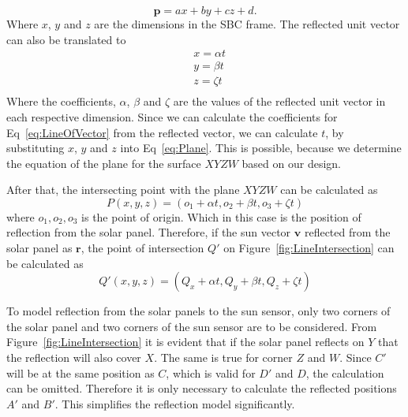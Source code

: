 \begin{equation}
	\mathbf{p} = ax + by + cz + d.
	\label{eq:Plane}
\end{equation}
Where $x$, $y$ and $z$ are the dimensions in the SBC frame. The reflected unit vector can also be translated to 
\begin{equation}
	\begin{aligned}
		&	x = \alpha t \\
		&	y = \beta t \\
		&	z = \zeta t \\
	\end{aligned}
	\label{eq:LineOfVector}
\end{equation}
Where the coefficients, $\alpha$, $\beta$ and $\zeta$ are the values of the reflected unit vector in each respective dimension. Since we can calculate the coefficients for Eq~\ref{eq:LineOfVector} from the reflected vector, we can calculate $t$, by substituting $x$, $y$ and $z$ into Eq~\ref{eq:Plane}. This is possible, because we determine the equation of the plane for the surface $XYZW$ based on our design. 

After that, the intersecting point with the plane $XYZW$ can be calculated as
\begin{equation}
	P(x, y, z) = (o_1 + \alpha t, o_2 + \beta t, o_3 + \zeta t)
	\label{eq:Intersection}
\end{equation}
where $o_1, o_2, o_3$ is the point of origin. Which in this case is the position of reflection from the solar panel. Therefore, if the sun vector $\mathbf{v}$ reflected from the solar panel as $\mathbf{r}$, the point of intersection $Q'$ on Figure~\ref{fig:LineIntersection} can be calculated as
\begin{equation}
	Q'(x, y, z) = (Q_x + \alpha t, Q_y + \beta t, Q_z + \zeta t)
	\label{eq:SpecificIntersection}
\end{equation}

To model reflection from the solar panels to the sun sensor, only two corners of the solar panel and two corners of the sun sensor are to be considered. From Figure~\ref{fig:LineIntersection} it is evident that if the solar panel reflects on $Y$ that the reflection will also cover $X$. The same is true for corner $Z$ and $W$. Since $C'$ will be at the same position as $C$, which is valid for $D'$ and $D$, the calculation can be omitted. Therefore it is only necessary to calculate the reflected positions $A'$ and $B'$. This simplifies the reflection model significantly.

